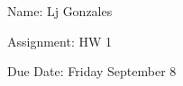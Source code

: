 \documentclass[11 pt]{article}
\begin{document}
    Name: Lj Gonzales

    Assignment: HW 1 

    Due Date: Friday September 8
    \break
\begin{problem}
\end{problem}
\begin{solution}
\end{solution} 
\pagebreak
\begin{problem}
\end{problem}
\begin{solution}
\end{solution}
\pagebreak
\begin{problem}
\end{problem}
\begin{solution}
\end{solution}
\pagebreak
\begin{problem}
\end{problem}
\begin{solution}
\end{solution}
\pagebreak
\begin{problem}
\end{problem}
\begin{solution}
\end{solution}
\pagebreak
\begin{problem}
\end{problem}
\begin{solution}
\end{solution}
\end{document}
